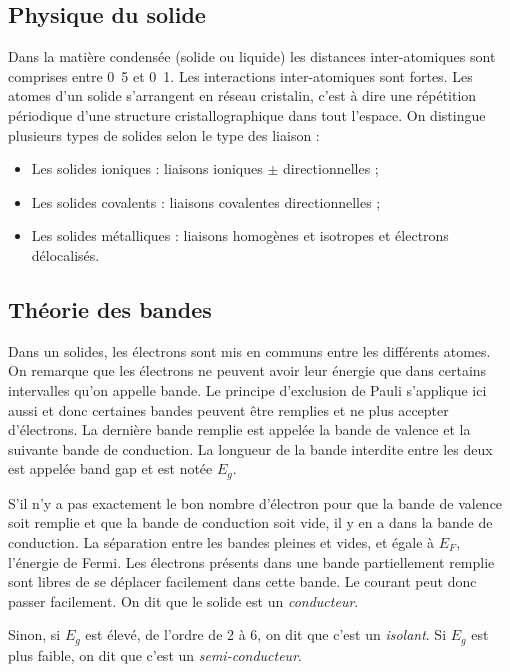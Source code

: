 \subsection{Physique du solide}
Dans la matière condensée (solide ou liquide)
les distances inter-atomiques sont comprises entre
\unit{0.5}{\nano\meter} et \unit{0.1}{\nano\meter}.
Les interactions inter-atomiques sont fortes.
Les atomes d'un solide s'arrangent en réseau cristalin,
c'est à dire une répétition périodique d'une structure
cristallographique dans tout l'espace.
On distingue plusieurs types de solides selon
le type des liaison :
\begin{itemize}
	\item Les solides ioniques : liaisons ioniques $\pm$
	directionnelles ;
	\item Les solides covalents : liaisons covalentes
	directionnelles ;
	\item Les solides métalliques : liaisons homogènes
	et isotropes et électrons délocalisés.
\end{itemize}


\subsection{Théorie des bandes}
Dans un solides,
les électrons sont mis en communs entre les différents atomes.
On remarque que les électrons ne peuvent avoir leur énergie que dans certains
intervalles qu'on appelle bande.
Le principe d'exclusion de Pauli s'applique ici aussi et donc certaines
bandes peuvent être remplies et ne plus accepter d'électrons.
La dernière bande remplie est appelée la bande de valence et la suivante
bande de conduction.
La longueur de la bande interdite entre les deux est appelée
band gap et est notée $E_g$.

S'il n'y a pas exactement le bon nombre d'électron pour
que la bande de valence soit remplie et que la bande de conduction soit
vide, il y en a dans la bande de conduction.
La séparation entre les bandes pleines et vides, et égale à $E_F$,
l'énergie de Fermi.
Les électrons présents dans une bande partiellement remplie sont libres de se
déplacer facilement dans cette bande. Le courant peut donc passer facilement.
On dit que le solide est un \emph{conducteur}.

Sinon, si $E_g$ est élevé, de l'ordre de 2 à \si{6}{\electronvolt},
on dit que c'est un \emph{isolant}.
Si $E_g$ est plus faible, on dit que c'est un \emph{semi-conducteur}.

